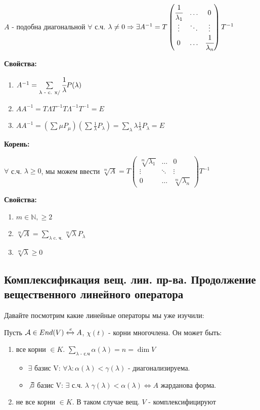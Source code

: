 $A$ - подобна диагональной 
$\forall $ с.ч. $\lambda \neq 0 \Rightarrow \exists A^{-1} = T\begin{pmatrix}
    \cfrac{1}{\lambda_1} & \ldots & 0 \\
    \vdots &\ddots& \vdots\\
    0 & \ldots &\cfrac{1}{\lambda_n}
\end{pmatrix} T^{-1}$

\textbf{Свойства:}
\begin{enumerate}
    \item $A^{-1} = \sum\limits_{\lambda \text{ - c. x/}}\cfrac{1}{\lambda}P(\lambda)$
    \item $AA^{-1}=T \Lambda T^{-1}T \Lambda^{-1} T^{-1} = E$
    \item $AA^{-1}=(\sum \mu P_{\mu})(\sum \frac{1}{\lambda}P_{\lambda})= \sum\limits_{\lambda} \lambda \frac{1}{\lambda}P_{\lambda} = E$
\end{enumerate}

\textbf{Корень:}

$\forall$ с.ч. $\lambda \geq 0$, мы можем ввести $\sqrt[m]{A} = T\begin{pmatrix}
    \sqrt[m]{\lambda_1} & \ldots & 0 \\
    \vdots &\ddots& \vdots\\
    0 & \ldots &\sqrt[m]{\lambda_n}
\end{pmatrix}T^{-1}$

\textbf{Свойства:}
\begin{enumerate}
    \item $m \in \mathbb{N}, \geqslant2$
    \item $\sqrt[m]{A}= \sum\limits_{\lambda \text{  c. ч.}} \sqrt[m]{\lambda} P_{\lambda}$
    \item $\sqrt[m]{\lambda}\geqslant0$
\end{enumerate}

\subsection{Комплексификация вещ. лин. пр-ва. Продолжение вещественного линейного оператора}

Давайте посмотрим какие линейные операторы мы уже изучили: 


Пусть $\mathcal{A} \in End(V) \xleftrightarrow{e} A $, $\chi(t)$ - корни многочлена. Он может быть:

\begin{enumerate}
    \item все корни $\in K$. $\sum\limits_{\lambda \text{ - с.ч}}\alpha(\lambda) = n  = \dim V$
    \begin{itemize}
        \item $\exists$ базис V: $\forall \lambda: \alpha(\lambda)<\gamma(\lambda)$  - диагонализируема.
        \item $\not \exists $ базис V: $\exists $ с.ч. $\lambda$ \text{  } $\gamma(\lambda) < \alpha(\lambda) \iff A$ жарданова форма.
    \end{itemize}
    \item не все корни $\in K$. В таком случае вещ. $V$ - комплексифицируют
\end{enumerate}


